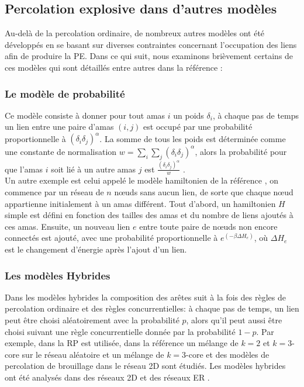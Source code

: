 \subsection{Percolation explosive dans d'autres modèles}
Au-delà de la percolation ordinaire, de nombreux autres modèles ont été développés en se basant sur diverses contraintes concernant l'occupation des liens afin de produire la PE. Dans ce qui suit, nous examinons brièvement certains de ces modèles qui sont détaillés entre autres dans la référence \cite{Boccaletti-al2016}: 
\subsubsection{Le modèle de probabilité}
Ce modèle consiste à donner pour tout amas $i$ un poids $\delta_i$, à chaque pas de temps un lien entre une paire d'amas $(i,j)$ est occupé par une probabilité proportionnelle à $(\delta_i\delta_j)^{\alpha}$. La somme  de tous les poids est déterminée comme une constante de normalisation $w=\sum_i\sum_j(\delta_i\delta_j)^{\alpha}$, alors la probabilité pour que l'amas $i$ soit lié à un autre amas $j$ est $\frac{(\delta_i\delta_j)^{\alpha}}{w}$ \cite{Cho-al2010}.\\ Un autre exemple est celui appelé le modèle hamiltonien de la référence \cite{Moreira-al2010}, on commence par un réseau de $n$ nœuds sans aucun lien, de sorte que chaque nœud appartienne initialement à un amas différent. Tout d'abord, un hamiltonien $H$ simple est défini en fonction des tailles des amas et du nombre de liens ajoutés à ces amas. Ensuite, un nouveau lien $e$ entre toute paire de nœuds non encore connectés est ajouté, avec une probabilité proportionnelle à $e^{(-\beta\Delta H_e)}$, où $\Delta H_e$ est le changement d'énergie après l'ajout d'un lien.

\subsubsection{Les modèles Hybrides}
Dans les modèles hybrides la composition des arêtes suit à la fois des règles de percolation ordinaire et des règles concurrentielles: à chaque pas de temps, un lien peut être choisi aléatoirement avec la probabilité $p$, alors qu'il peut aussi être choisi suivant une règle concurrentielle donnée par la probabilité $1-p$. Par exemple, dans \cite{Bastas-al2014} la RP est utilisée, dans la référence \cite{Cao-Schwarz2012} un mélange de $k=2$ et $k=3$-core sur le réseau aléatoire et un mélange de $k=3$-core et des modèles de percolation de brouillage dans le réseau 2D sont étudiés. Les modèles hybrides ont été analysés dans des réseaux 2D \cite{Cao-Schwarz2012,Bastas-al2014} et des réseaux ER  \cite{Cao-Schwarz2012,Bastas-al2014,Fan-al2012}.
